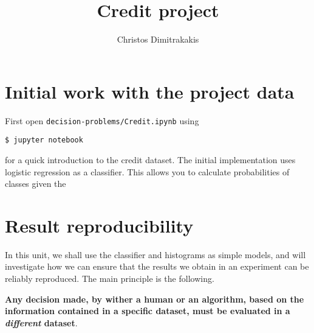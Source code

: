 \documentclass[a4paper,twoside]{article}
\title{Credit project}
\author[C. Dimitrakakis]{Christos Dimitrakakis}
\begin{document}
\maketitle
\tableofcontents

\section{Initial work with the project data}

First open \texttt{decision-problems/Credit.ipynb} using
\begin{verbatim}
$ jupyter notebook
\end{verbatim}
for a quick introduction to the credit dataset. The initial implementation uses logistic regression as a classifier. This allows you to calculate probabilities of classes given the 

\section{Result reproducibility}
In this unit, we shall use the \KNN{} classifier and histograms as simple models, and will investigate how we can ensure that the results we obtain in an experiment can be reliably reproduced. The main principle is the following.

\textbf{Any decision made, by wither a human or an algorithm, based on the information contained in a specific dataset, must be evaluated in a \emph{different} dataset}.
\end{document}
